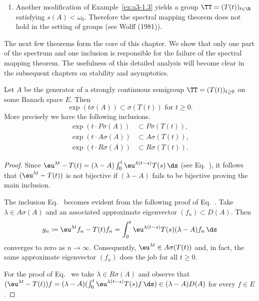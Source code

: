 \begin{example}
\begin{enumerate}[\upshape (i), wide, labelindent=.25em]
\item 
Another modification of Example~\ref{ex:a3-1.3} yields a group $\TT = (T(t))_{t \in \R}$ satisfying $s(A) < \omega_{0}$.
Therefore the spectral mapping theorem does not hold in the setting of groups (see Wolff (1981)).
\end{enumerate}
\end{example}
The next few theorems form the core of this chapter. 
We show that only one part of the spectrum and one inclusion is responsible for the failure of the spectral mapping theorem.
The usefulness of this detailed analysis will become clear in the subsequent chapters on stability and asymptotics.
\begin{proposition}
\label{prop:a3-6.2}%
	
Let $A$ be the generator of a strongly continuous semigroup $\TT = (T(t))_{t \geq 0}$ on some Banach space $E$.
Then
\[
\exp(t\sigma(A)) \subset \sigma(T(t)) \text{ for } t \geq 0 .
\]
More precisely we have the following inclusions.
\begin{align}
\exp(t \cdot P\sigma(A)) &\subset P\sigma(T(t)) \label{eq:a3-6.1} , \\
\exp(t \cdot A\sigma(A)) &\subset A\sigma(T(t)) \label{eq:a3-6.2} , \\
\exp(t \cdot R\sigma(A)) &\subset R\sigma(T(t)) \label{eq:a3-6.3} .
\end{align}
\end{proposition}
\begin{proof}
Since $\eu^{\lambda t} - T(t) = (\lambda - A)\int_{0}^{t} \eu^{\lambda(t-s)}T(s) \, \ds$ (see Eq.~), it follows that $(\eu^{\lambda t} - T(t))$ is not bijective if\/ $(\lambda - A)$ fails to be bijective proving the main inclusion.

The inclusion Eq.~ becomes evident from the following proof of Eq.~. Take $\lambda \in A\sigma(A)$ and an associated approximate eigenvector $(f_{n}) \subset D(A)$.
Then
\[
g_{n} \coloneqq \eu^{\lambda t}f_{n} - T(t)f_{n} = \int_{0}^{t} \eu^{\lambda(t-s)}T(s)(\lambda-A)f_{n} \, \ds
\]
converges to zero as $n \to \infty$.
Consequently, $\eu^{\lambda t} \in A\sigma(T(t))$ and, in fact, the same approximate eigenvector $(f_{n})$ does the job for all $t \geq 0$.

For the proof of Eq.~ we take $\lambda \in R\sigma(A)$ and observe that $(\eu^{\lambda t} - T(t))f = (\lambda - A)(\int_{0}^{t} \eu^{\lambda(t-s)}T(s)f \, \ds) \in (\lambda - A)D(A)$ for every $f \in E$.
\end{proof}
